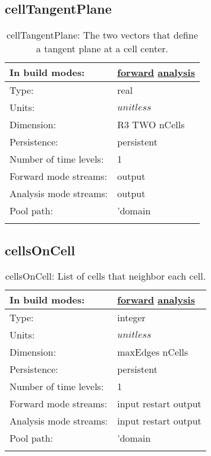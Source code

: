 \subsection[cellTangentPlane]{cellTangentPlane}
\label{subsec:var_sec_mesh_cellTangentPlane}
\begin{center}
\begin{longtable}{| p{2.0in} | p{4.0in} |}
        \hline 
        In build modes: & \hyperref[subsec:forward_var_tab_mesh]{forward} \hyperref[subsec:analysis_var_tab_mesh]{analysis} \\
        \hline 
        Type: & real \\
        \hline 
        Units: & $unitless$ \\
        \hline 
        Dimension: & R3 TWO nCells \\
        \hline 
        Persistence: & persistent \\
        \hline 
        Number of time levels: & 1 \\
        \hline 
		 Forward mode streams: &  output \\
        \hline 
		 Analysis mode streams: &  output \\
        \hline 
            Pool path: & 'domain %
 \\
		 \hline 
    \caption{cellTangentPlane: The two vectors that define a tangent plane at a cell center.}
\end{longtable}
\end{center}
\subsection[cellsOnCell]{cellsOnCell}
\label{subsec:var_sec_mesh_cellsOnCell}
\begin{center}
\begin{longtable}{| p{2.0in} | p{4.0in} |}
        \hline 
        In build modes: & \hyperref[subsec:forward_var_tab_mesh]{forward} \hyperref[subsec:analysis_var_tab_mesh]{analysis} \\
        \hline 
        Type: & integer \\
        \hline 
        Units: & $unitless$ \\
        \hline 
        Dimension: & maxEdges nCells \\
        \hline 
        Persistence: & persistent \\
        \hline 
        Number of time levels: & 1 \\
        \hline 
		 Forward mode streams: &  input restart output \\
        \hline 
		 Analysis mode streams: &  input restart output \\
        \hline 
            Pool path: & 'domain %
 \\
		 \hline 
    \caption{cellsOnCell: List of cells that neighbor each cell.}
\end{longtable}
\end{center}
